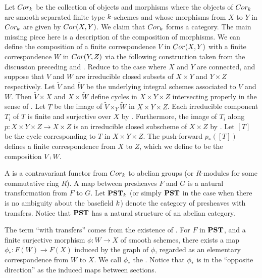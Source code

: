 Let $Cor_{k}$ be the collection of objects and morphisms
where the objects of $Cor_k$ are smooth separated finite type
$k$-schemes and whose morphisms from $X$ to $Y$ in 
$Cor_k$ are given by $Cor(X, Y)$. We claim that
$Cor_{k}$ forms a category. The main missing piece here 
is a description of the composition of morphisms. We can define 
the composition of a finite correspondence $V$ in $Cor(X, Y)$
with a finite correspondence $W$ in $Cor(Y, Z)$ via
the following construction taken from the discussion preceding 
\cite[1.5]{MVW} and \cite[1.7]{MVW}. Reduce to the case where $X$ 
and $Y$ are connected, and suppose that $V$ and $W$ are 
irreducible closed subsets of $X \times Y$ and $Y \times Z$ 
respectively. Let $\tilde{V}$ and $\tilde{W}$ be the underlying 
integral schemes associated to $V$ and $W$. Then $\tilde{V} \times 
X$ and $X \times \tilde{W}$ define cycles in $X \times Y \times Z$ 
intersecting properly in the sense of \cite[2.4]{Ful84}. Let $T$
be the image of $\tilde{V} \times_Y \tilde{W}$ in $X \times Y \times Z$.
Each irreducible component $T_i$ of $T$ is finite and surjective
over $X$ by \cite[1.7]{MVW}. Furthermore, the image of $T_i$ along
$p: X \times Y \times Z \to X \times Z$ is an irreducible closed
subscheme of $X \times Z$ by \cite[1.4]{MVW}. Let $[T]$ be the 
cycle corresponding to $T$ in $X \times Y \times Z$. The 
push-forward $p_*([T])$ defines a finite correspondence from $X$ 
to $Z$, which we define to be the composition $V \comp W$.

\begin{defn}\label{def_pst}
A  is a contravariant functor from 
$Cor_k$ to abelian groups (or $R$-modules for some commutative 
ring $R$). A map between presheaves $F$ and $G$ is a natural 
transformation from $F$ to $G$. Let $\mathbf{PST}_{k}$ (or simply 
$\mathbf{PST}$ in the case when there is no ambiguity about the basefield 
$k$) denote the category of presheaves with transfers. 
Notice that $\mathbf{PST}$ has a natural structure of an abelian category.
\end{defn}

\begin{rmk}
The term ``with transfers'' comes from the existence of 
. For $F$ in $\mathbf{PST}$, and a finite surjective
morphism $\phi : W \to X$ of smooth schemes, there exists a
map $\phi_*: F(W) \to F(X)$ induced by the graph of $\phi$,
regarded as an elementary correspondence from $W$ to $X$.
We call $\phi_*$ the . Notice that $\phi_*$
is in the ``opposite direction'' as the induced maps between
sections.
\end{rmk}

